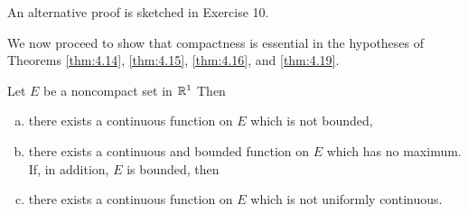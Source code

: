 An alternative proof is sketched in Exercise 10.

We now proceed to show that compactness is essential in the hypotheses
of Theorems \ref{thm:4.14}, \ref{thm:4.15}, \ref{thm:4.16}, and \ref{thm:4.19}.

\begin{thm}
    \label{thm:4.20}
    Let $E$ be a noncompact set in ${\protect\mathbb R}^{1}$ Then
    \begin{enumerate}[(a)]
    \item there exists a continuous function on $E$ which is not bounded,     
    \item there exists a continuous and bounded function on $E$ which has no maximum.\\
    If, in addition, $E$ is bounded, then     
    \item there exists a continuous function on $E$ which is not uniformly continuous.
    \end{enumerate}
\end{thm}

